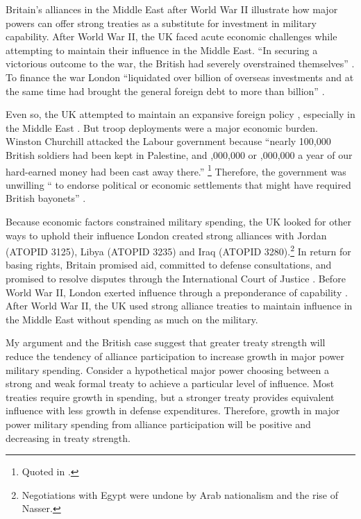 \documentclass[12pt]{article}
\begin{document}
Britain's alliances in the Middle East after World War II illustrate how major powers can offer strong treaties as a substitute for investment in military capability. 
After World War II, the UK faced acute economic challenges while attempting to maintain their influence in the Middle East. 
``In securing a victorious outcome to the war, the British had severely overstrained themselves'' \citep[pg. 367]{Kennedy1987}. 
To finance the war London ``liquidated over  billion of overseas investments and at the same time had brought the general foreign debt to more than  billion'' \citep[pg. 12]{Louis1984}.
 

Even so, the UK attempted to maintain an expansive foreign policy \citep{Mayhew1950}, especially in the Middle East \citep{Rahman1982}. 
But troop deployments were a major economic burden. 
Winston Churchill attacked the Labour government because ``nearly 100,000 British soldiers had been kept in Palestine, and ,000,000 or ,000,000 a year of our hard-earned money had been cast away there.''
\footnote{Quoted in \citet[pg. 11]{Louis1984}.}
Therefore, the government was unwilling `` to endorse political or economic settlements that might have required British bayonets'' \citep[pg. 15]{Louis1984}. 


Because economic factors constrained military spending, the UK looked for other ways to uphold their influence \citep{Monroe1963, Louis1984}
London created strong alliances with Jordan (ATOPID 3125), Libya (ATOPID 3235) and Iraq (ATOPID 3280).\footnote{Negotiations with Egypt were undone by Arab nationalism and the rise of Nasser.} 
In return for basing rights, Britain promised aid, committed to defense consultations, and promised to resolve disputes through the International Court of Justice \citep{Leedsetal2002}. 
Before World War II, London exerted influence through a preponderance of capability \citep{Monroe1963}.
After World War II, the UK used strong alliance treaties to maintain influence in the Middle East without spending as much on the military. 


My argument and the British case suggest that greater treaty strength will reduce the tendency of alliance participation to increase growth in major power military spending.
Consider a hypothetical major power choosing between a strong and weak formal treaty to achieve a particular level of influence.  
Most treaties require growth in spending, but a stronger treaty provides equivalent influence with less growth in defense expenditures. 
Therefore, growth in major power military spending from alliance participation will be positive and decreasing in treaty strength. 
\end{document}

